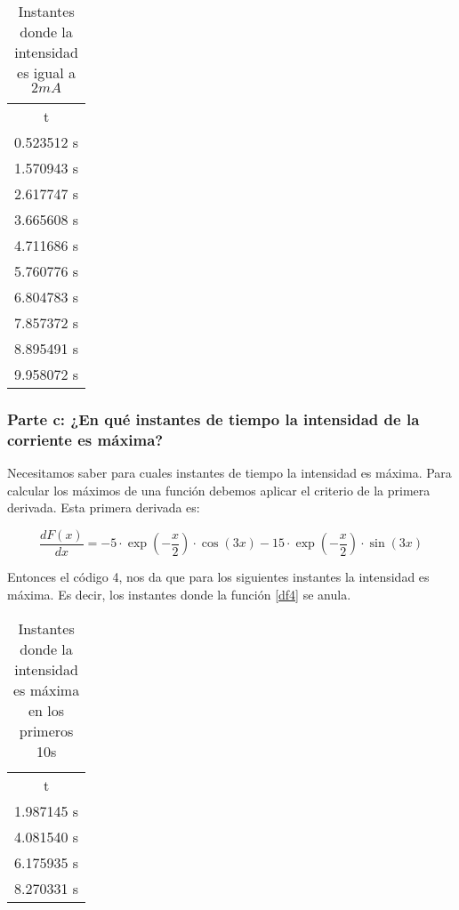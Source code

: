 \documentclass[12pt]{article}
\begin{document}
\begin{table}[h]
    \centering
    \begin{tabular}{c}
        t\\
        0.523512 s\\
        1.570943 s\\
         2.617747 s\\
       3.665608 s\\
        4.711686 s\\
        5.760776 s\\
        6.804783 s\\
        7.857372 s\\
        8.895491 s\\
       9.958072 s\\
    \end{tabular}
    \caption{Instantes donde la intensidad es igual a $2mA$}
    \label{tab:my_label}
\end{table}


\subsubsection{Parte c: ¿En qué instantes de tiempo la intensidad de la corriente es máxima?}
Necesitamos saber para cuales instantes de tiempo la intensidad es máxima. Para calcular los máximos de una función debemos aplicar el criterio de la primera derivada. Esta primera derivada es:

\begin{equation}
\label{df4}
   \frac{dF(x)}{dx} = -5 \cdot \exp\left( - \frac{x}{2} \right) \cdot \cos(3x) - 15 \cdot \exp\left( - \frac{x}{2} \right) \cdot \sin(3x)
\end{equation}

Entonces el código 4, nos da que para los siguientes instantes la intensidad es máxima. Es decir, los instantes donde la función \ref{df4} se anula. 

\begin{table}[h]
    \centering
    \begin{tabular}{c}
        t\\
        1.987145 s\\
        4.081540 s\\
        6.175935 s\\
        8.270331 s\\
    \end{tabular}
    \caption{Instantes donde la intensidad es máxima en los primeros 10s}
    \label{tab:my_label}
\end{table}
\end{document}
